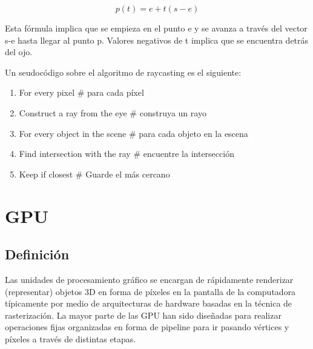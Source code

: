 \begin{equation}
\label{eq:ray_definition}
  p(t) = e+t(s-e)
\end{equation}

Esta fórmula implica que se empieza en el punto e y se avanza a través del vector s-e hasta llegar al punto p. Valores negativos de t implica que se encuentra detrás del ojo.

Un seudocódigo sobre el algoritmo de raycasting es el siguiente:

\begin{enumerate}

\item For every pixel \# para cada píxel 
\item \hspace{5 mm} Construct a ray from the eye \hspace{3 mm} \# construya un rayo
\item \hspace{5 mm} For every object in the scene \hspace{3 mm} \# para cada objeto en la escena
\item \hspace{10 mm}	 Find intersection with the ray \hspace{3 mm} \# encuentre la intersección 	
\item \hspace{10 mm} Keep if closest 				\hspace{3 mm} \# Guarde el más cercano

\end{enumerate}

\section{GPU}
\subsection{Definición}

Las unidades de procesamiento gráfico se encargan de rápidamente renderizar (representar) objetos 3D en forma de píxeles en la pantalla de la computadora típicamente por medio de arquitecturas de hardware basadas en la técnica de rasterización. La mayor parte de las GPU han sido diseñadas para realizar operaciones fijas organizadas en forma de pipeline para ir pasando vértices y píxeles a través de distintas etapas.  

